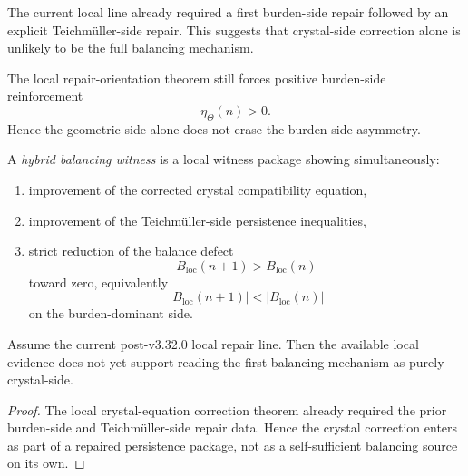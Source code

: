 \begin{remark}
\label{rem:why-pure-crystal-correction-probably-not-enough}
The current local line already required a first burden-side repair followed by an explicit Teichm\"uller-side repair. This suggests that crystal-side correction alone is unlikely to be the full balancing mechanism.
\end{remark}

\begin{remark}
\label{rem:why-pure-teichmueller-correction-probably-not-enough}
The local repair-orientation theorem still forces positive burden-side reinforcement
\[
  \eta_{\Theta}(n)>0.
\]
Hence the geometric side alone does not erase the burden-side asymmetry.
\end{remark}

\begin{definition}
\label{def:hybrid-balancing-witness}
A \emph{hybrid balancing witness} is a local witness package showing simultaneously:
\begin{enumerate}[leftmargin=2em,label=(\alph*)]
  \item improvement of the corrected crystal compatibility equation,
  \item improvement of the Teichm\"uller-side persistence inequalities,
  \item strict reduction of the balance defect
  \[
    B_{\mathrm{loc}}(n+1)>B_{\mathrm{loc}}(n)
  \]
  toward zero, equivalently
  \[
    |B_{\mathrm{loc}}(n+1)|<|B_{\mathrm{loc}}(n)|
  \]
  on the burden-dominant side.
\end{enumerate}
\end{definition}

\begin{proposition}
\label{prop:current-line-does-not-yet-support-purely-crystal-balancing}
Assume the current post-v3.32.0 local repair line. Then the available local evidence does not yet support reading the first balancing mechanism as purely crystal-side.
\end{proposition}

\begin{proof}
The local crystal-equation correction theorem already required the prior burden-side and Teichm\"uller-side repair data. Hence the crystal correction enters as part of a repaired persistence package, not as a self-sufficient balancing source on its own.
\end{proof}

